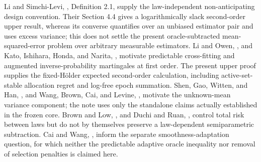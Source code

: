 Li and Simchi-Levi, \cite{LiSimchiLevi2026SequentialEfficiency}, Definition 2.1, supply the law-independent non-anticipating design convention.  Their Section 4.4 gives a logarithmically slack second-order upper result, whereas its converse quantifies over an unbiased estimator pair and uses excess variance; this does not settle the present oracle-subtracted mean-squared-error problem over arbitrary measurable estimators.  Li and Owen, \cite{LiOwen2024BatchDML}, and Kato, Ishihara, Honda, and Narita, \cite{KatoIshiharaHondaNarita2020AdaptiveATE}, motivate predictable cross-fitting and augmented inverse-probability martingales at first order.  The present upper proof supplies the fixed-Hölder expected second-order calculation, including active-set-stable allocation regret and log-free epoch summation.  Shen, Gao, Witten, and Han, \cite{ShenGaoWittenHan2020Variance}, and Wang, Brown, Cai, and Levine, \cite{WangBrownCaiLevine2008MeanVariance}, motivate the unknown-mean variance component; the note uses only the standalone claims actually established in the frozen core.  Brown and Low, \cite{BrownLow1996ConstrainedRisk}, and Duchi and Ruan, \cite{DuchiRuan2021ConstrainedRisk}, control total risk between laws but do not by themselves preserve a law-dependent semiparametric subtraction.  Cai and Wang, \cite{CaiWang2008AdaptiveVariance}, inform the separate smoothness-adaptation question, for which neither the predictable adaptive oracle inequality nor removal of selection penalties is claimed here.